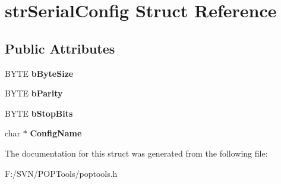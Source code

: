\hypertarget{structstr_serial_config}{\section{str\-Serial\-Config Struct Reference}
\label{structstr_serial_config}
}
\subsection*{Public Attributes}
\begin{DoxyCompactItemize}
\item 
\hypertarget{structstr_serial_config_aa6d4be7e69575af7e1359f50d5a66645}{B\-Y\-T\-E {\bfseries b\-Byte\-Size}}\label{structstr_serial_config_aa6d4be7e69575af7e1359f50d5a66645}

\item 
\hypertarget{structstr_serial_config_af5ddcf2090cb8712b1c7949f012973a6}{B\-Y\-T\-E {\bfseries b\-Parity}}\label{structstr_serial_config_af5ddcf2090cb8712b1c7949f012973a6}

\item 
\hypertarget{structstr_serial_config_a221e833b05d0a28134c4df46ee77afba}{B\-Y\-T\-E {\bfseries b\-Stop\-Bits}}\label{structstr_serial_config_a221e833b05d0a28134c4df46ee77afba}

\item 
\hypertarget{structstr_serial_config_aa588953fc89297ab0e82615e040ea7d1}{char $\ast$ {\bfseries Config\-Name}}\label{structstr_serial_config_aa588953fc89297ab0e82615e040ea7d1}

\end{DoxyCompactItemize}


The documentation for this struct was generated from the following file\-:\begin{DoxyCompactItemize}
\item 
F\-:/\-S\-V\-N/\-P\-O\-P\-Tools/poptools.\-h\end{DoxyCompactItemize}
